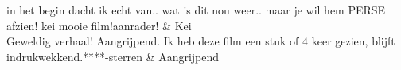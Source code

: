 \begin{table}
\begin{tabu}
in het begin dacht ik echt van.. wat is dit nou weer.. maar je wil hem PERSE afzien! kei mooie film!aanrader!                                                                                                                                                                                                                                                                                                                                                                                                                                                                                                                                                                                                                                                                                                                                                                                                                                                                                                                                                                                                                                                                                                                                                                                                                                                                                                                                                                                   & Kei                                  \\ \hline
Geweldig verhaal! Aangrijpend. Ik heb deze film een stuk of 4 keer gezien, blijft indrukwekkend.****-sterren                                                                                                                                                                                                                                                                                                                                                                                                                                                                                                                                                                                                                                                                                                                                                                                                                                                                                                                                                                                                                                                                                                                                                                                                                                                                                                                                                                                    & Aangrijpend                          \\ \hline

\end{tabu}
\end{table}
